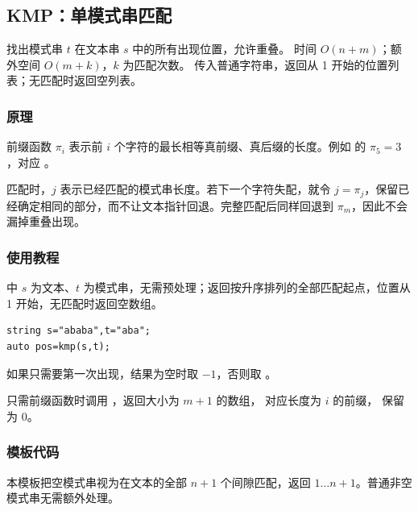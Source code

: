 \subsection{KMP：单模式串匹配}
\label{algo:kmp}
\AlgorithmInfo
    {找出模式串 $t$ 在文本串 $s$ 中的所有出现位置，允许重叠。}
    {时间 $O(n+m)$；额外空间 $O(m+k)$，$k$ 为匹配次数。}
    {传入普通字符串，返回从 1 开始的位置列表；无匹配时返回空列表。}

\subsubsection*{原理}
前缀函数 $\pi_i$ 表示前 $i$ 个字符的最长相等真前缀、真后缀的长度。例如  的 $\pi_5=3$，对应 。

匹配时，$j$ 表示已经匹配的模式串长度。若下一个字符失配，就令 $j=\pi_j$，保留已经确定相同的部分，而不让文本指针回退。完整匹配后同样回退到 $\pi_m$，因此不会漏掉重叠出现。

\subsubsection*{使用教程}
 中 $s$ 为文本、$t$ 为模式串，无需预处理；返回按升序排列的全部匹配起点，位置从 1 开始，无匹配时返回空数组。
\begin{lstlisting}[style=mtycpp,numbers=none]
string s="ababa",t="aba";
auto pos=kmp(s,t);
\end{lstlisting}
如果只需要第一次出现，结果为空时取 $-1$，否则取 。

只需前缀函数时调用 ，返回大小为 $m+1$ 的数组， 对应长度为 $i$ 的前缀， 保留为 $0$。

\subsubsection*{模板代码}

本模板把空模式串视为在文本的全部 $n+1$ 个间隙匹配，返回 $1\ldots n+1$。普通非空模式串无需额外处理。
